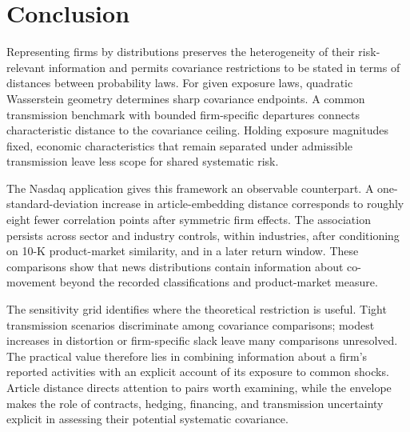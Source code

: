 \section{Conclusion}\label{sec:conclusion}

Representing firms by distributions preserves the heterogeneity of their
risk-relevant information and permits covariance restrictions to be stated
in terms of distances between probability laws.
For given exposure laws, quadratic Wasserstein geometry determines sharp
covariance endpoints.
A common transmission benchmark with bounded firm-specific departures
connects characteristic distance to the covariance ceiling.
Holding exposure magnitudes fixed, economic characteristics that remain
separated under admissible transmission leave less scope for shared
systematic risk.

The Nasdaq application gives this framework an observable counterpart.
A one-standard-deviation increase in article-embedding distance corresponds
to roughly eight fewer correlation points after symmetric firm effects.
The association persists across sector and industry controls, within
industries, after conditioning on 10-K product-market similarity, and in a
later return window.
These comparisons show that news distributions contain information about
co-movement beyond the recorded classifications and product-market measure.

The sensitivity grid identifies where the theoretical restriction is useful.
Tight transmission scenarios discriminate among covariance comparisons;
modest increases in distortion or firm-specific slack leave many comparisons
unresolved.
The practical value therefore lies in combining information about a firm's
reported activities with an explicit account of its exposure to common shocks.
Article distance directs attention to pairs worth examining, while the
envelope makes the role of contracts, hedging, financing, and transmission
uncertainty explicit in assessing their potential systematic covariance.
